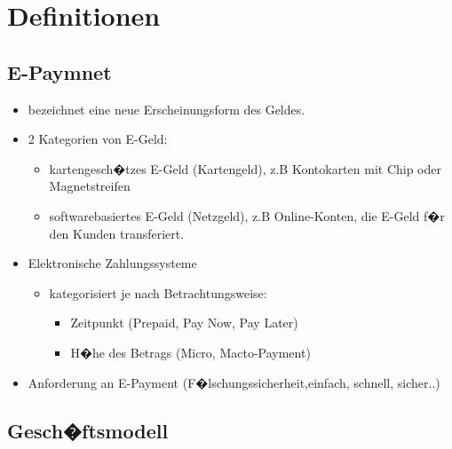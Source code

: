 \clearpage

\section{Definitionen}

\subsection{E-Paymnet}

\begin{itemize}

	\item bezeichnet eine neue Erscheinungsform des Geldes.
	\item 2 Kategorien von E-Geld:
    
    \begin{itemize}
    	\item kartengesch�tzes E-Geld (Kartengeld), z.B Kontokarten mit Chip oder Magnetstreifen
        \item softwarebasiertes E-Geld (Netzgeld), z.B Online-Konten, die E-Geld f�r den Kunden transferiert.

    \end{itemize}

	\item Elektronische Zahlungssysteme
 	\begin{itemize}
    	\item kategorisiert je nach Betrachtungsweise:
        \begin{itemize}
    		\item Zeitpunkt (Prepaid, Pay Now, Pay Later)
            \item H�he des Betrags (Micro, Macto-Payment)
		\end{itemize}
	\end{itemize}
    
    
    
    \item Anforderung an E-Payment (F�lschungssicherheit,einfach, schnell, sicher..)
\end{itemize}




\subsection{Gesch�ftsmodell}

